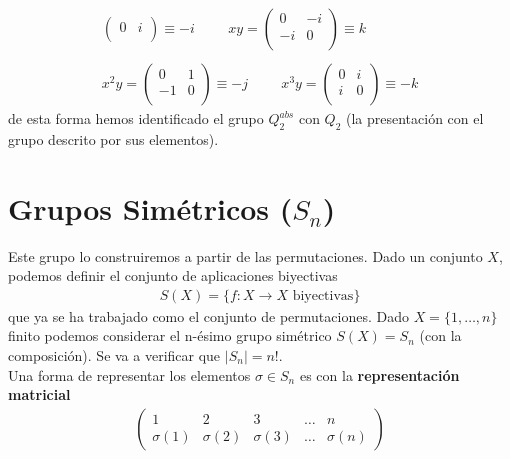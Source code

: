 \begin{ejemplo}
\begin{enumerate}
\begin{gather*}
\begin{pmatrix}
                0 & i\\
            \end{pmatrix} \equiv -i
            \hspace{1cm}
            xy = 
            \begin{pmatrix}
                0 & -i\\
                -i & 0\\
            \end{pmatrix} \equiv k\\\\
            x^2y = 
            \begin{pmatrix}
                0 & 1\\
                -1 & 0\\
            \end{pmatrix} \equiv -j
            \hspace{1cm}
            x^3y = 
            \begin{pmatrix}
                0 & i\\
                i & 0\\
            \end{pmatrix} \equiv -k
        \end{gather*}
        de esta forma hemos identificado el grupo $Q_2^{abs}$ con $Q_2$ (la presentación con el grupo descrito por sus elementos).
    \end{enumerate}
\end{ejemplo}

\section{Grupos Simétricos ($S_n$)}

Este grupo lo construiremos a partir de las permutaciones. Dado un conjunto $X$, podemos definir el conjunto de aplicaciones biyectivas 
\begin{gather*}
    S(X)=\{f:X \to X \text{ biyectivas}\}
\end{gather*}
que ya se ha trabajado como el conjunto de permutaciones. Dado $X=\{1,\dots,n\}$ finito podemos considerar el n-ésimo grupo simétrico $S(X)=S_n$ (con la composición). Se va a verificar que $|S_n|=n!$. \\

Una forma de representar los elementos $\sigma \in S_n$ es con la \textbf{representación matricial}
\begin{align*}
    \begin{pmatrix}
        1 & 2 & 3 & \dots & n\\
        \sigma(1) & \sigma(2) & \sigma(3) & \dots & \sigma(n)
    \end{pmatrix}
\end{align*}


